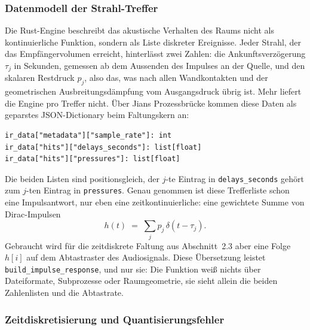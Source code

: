 \subsubsection{Datenmodell der Strahl-Treffer}
\label{subsubsec:datenmodell}

Die Rust-Engine beschreibt das akustische Verhalten des Raums nicht als
kontinuierliche Funktion, sondern als Liste diskreter Ereignisse. Jeder Strahl,
der das Empfängervolumen erreicht, hinterlässt zwei Zahlen: die
Ankunftsverzögerung $\tau_j$ in Sekunden, gemessen ab dem Aussenden des
Impulses an der Quelle, und den skalaren Restdruck $p_j$, also das, was nach
allen Wandkontakten und der geometrischen Ausbreitungsdämpfung vom
Ausgangsdruck übrig ist. Mehr liefert die Engine pro Treffer nicht. Über Jians
Prozessbrücke kommen diese Daten als geparstes JSON-Dictionary beim
Faltungskern an:

\begin{lstlisting}[style=cemdsp, caption={Erwartetes Schema des Engine-Ergebnisses (Auszug aus dem Docstring von \texttt{convolve}).}, label={lst:schema}]
ir_data["metadata"]["sample_rate"]: int
ir_data["hits"]["delays_seconds"]: list[float]
ir_data["hits"]["pressures"]: list[float]
\end{lstlisting}

Die beiden Listen sind positionsgleich, der $j$-te Eintrag in
\texttt{delays\_seconds} gehört zum $j$-ten Eintrag in \texttt{pressures}.
Genau genommen ist diese Trefferliste schon eine Impulsantwort, nur eben eine
zeitkontinuierliche: eine gewichtete Summe von Dirac-Impulsen
\[
    h(t) \;=\; \sum_{j} p_j \,\delta(t - \tau_j).
\]
Gebraucht wird für die zeitdiskrete Faltung aus Abschnitt~2.3 aber eine Folge
$h[i]$ auf dem Abtastraster des Audiosignals. Diese Übersetzung leistet
\texttt{build\_impulse\_response}, und nur sie: Die Funktion weiß nichts über
Dateiformate, Subprozesse oder Raumgeometrie, sie sieht allein die beiden
Zahlenlisten und die Abtastrate.

\subsubsection{Zeitdiskretisierung und Quantisierungsfehler}
\label{subsubsec:quantisierung}

